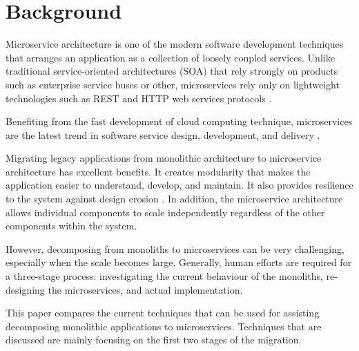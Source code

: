 \section{Background}
\label{sec:background}

Microservice architecture is one of the modern software development techniques that arranges an application as a collection of loosely coupled services. Unlike traditional service-oriented architectures (SOA) that rely strongly on products such as enterprise service buses or other, microservices rely only on lightweight technologies such as REST and HTTP web services protocols \cite{Jamshidi:Pahl:Mendonca:Lewis:Tilkov:2018}.

Benefiting from the fast development of cloud computing technique, microservices are the latest trend in software service design, development, and delivery \cite{Zimmermann:2017}. 

Migrating legacy applications from monolithic architecture to microservice architecture has excellent benefits. It creates modularity that makes the application easier to understand, develop, and maintain. It also provides resilience to the system against design erosion \cite{Chen:2018}. In addition, the microservice architecture allows individual components to scale independently regardless of the other components within the system. 

However, decomposing from monoliths to microservices can be very challenging, especially when the scale becomes large. Generally, human efforts are required for a three-stage process: investigating the current behaviour of the monoliths, re-designing the microservices, and actual implementation.

This paper compares the current techniques that can be used for assisting decomposing monolithic applications to microservices. Techniques that are discussed are mainly focusing on the first two stages of the migration.




